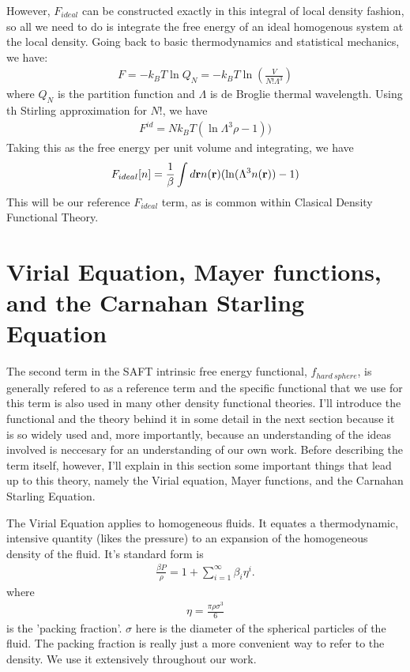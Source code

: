 However, $F_{ideal}$ can be constructed exactly in this integral of
local density fashion, so all we need to do is integrate the free
energy of an ideal homogenous system at the local density.  Going back
to basic thermodynamics and statistical mechanics, we have:
\begin{align}
  F = -k_BT \ln Q_N = -k_BT \ln (\frac{V}{N!\Lambda^3})
\end{align}
where $Q_N$ is the partition function and $\Lambda$ is de Broglie
thermal wavelength.  Using th Stirling approximation for $N!$, we have
\begin{align}
F^{id} = Nk_BT(\ln \Lambda^3 \rho - 1))
\end{align}
Taking this as the free energy per unit volume and integrating, we
have
\begin{align}
  F_{ideal}[n] = \frac{1}{\beta}\int d\textbf{r} n(\textbf{r})(\ln (\Lambda^3 n(\textbf{r}))-1)
\end{align}
This will be our reference $F_{ideal}$ term, as is common within
Clasical Density Functional Theory.

\clearpage
\newpage

\section{Virial Equation, Mayer functions, and the Carnahan Starling Equation}

The second term in the SAFT intrinsic free energy functional,
$f_{hard~sphere}$, is generally refered to as a reference term and the
specific functional that we use for this term is also used in many
other density functional theories.  I'll introduce the functional and
the theory behind it in some detail in the next section because it is
so widely used and, more importantly, because an understanding of the
ideas involved is neccesary for an understanding of our own work.
Before describing the term itself, however, I'll explain in this
section some important things that lead up to this theory, namely the
Virial equation, Mayer functions, and the Carnahan Starling Equation.

The Virial Equation applies to homogeneous fluids.  It equates a
thermodynamic, intensive quantity (likes the pressure) to an expansion
of the homogeneous density of the fluid.  It's standard form is
\begin{align}
  \label{eq:virial-expansion}
  \frac{\beta P}{\rho} = 1 + \sum_{i=1}^{\infty}\beta_i\eta^i.
\end{align}
where
\begin{align}
  \eta = \frac{\pi \rho \sigma^3}{6}
\end{align}
is the 'packing fraction'.  $\sigma$ here is the diameter of the
spherical particles of the fluid.  The packing fraction is really just
a more convenient way to refer to the density.  We use it extensively
throughout our work.


